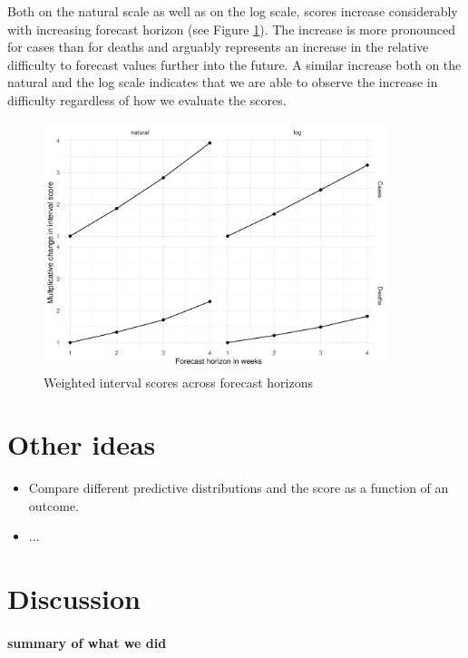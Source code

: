 \documentclass{article}
\begin{document}
Both on the natural scale as well as on the log scale, scores increase considerably with increasing forecast horizon (see Figure \ref{fig:HUB-scores-horizon}). The increase is more pronounced for cases than for deaths and arguably represents an increase in the relative difficulty to forecast values further into the future. A similar increase both on the natural and the log scale indicates that we are able to observe the increase in difficulty regardless of how we evaluate the scores. 

\begin{figure}[h!]
    \centering
    \includegraphics[width=0.9\textwidth]{output/figures/HUB-scores-over-horizon.png}
    \caption{Weighted interval scores across forecast horizons}
    \label{fig:HUB-scores-horizon}
\end{figure}



\section{Other ideas}
\begin{itemize}
    \item Compare different predictive distributions and the score as a function of an outcome.
    \item ...
\end{itemize}




\section{Discussion}

\paragraph{summary of what we did}
\end{document}
